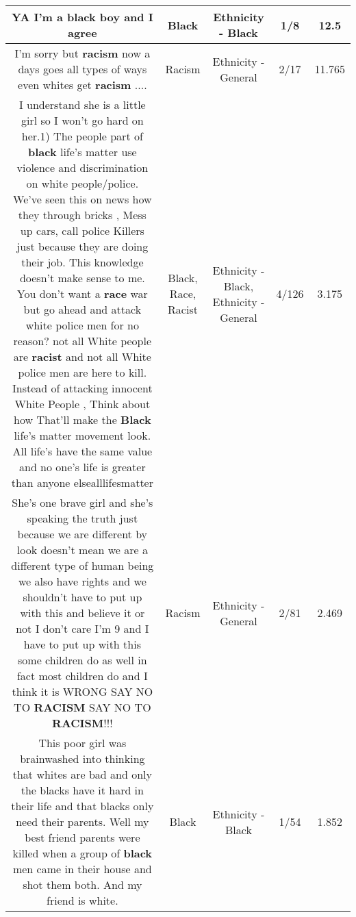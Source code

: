 \documentclass[11pt]{article}
\newlength\mylength
\begin{document}
\begin{center}
\begin{longtable}{|C{.65\mylength}|C{.30\mylength}|C{.12\mylength}|C{.12\mylength}|C{.12\mylength}|}
  \small YA I'm a \textbf{black} boy and I agree\normalsize   & Black & Ethnicity - Black & 1/8 & 12.5 \\  \hline
  \small I'm sorry but \textbf{racism} now a days goes all types of ways even whites get \textbf{racism} ....\normalsize   & Racism & Ethnicity - General & 2/17 & 11.765 \\  \hline
  \small I understand she is a little girl so I won't go hard on her.1) The people part of \textbf{black} life's matter use violence and discrimination on white people/police. We've seen this on news how they through bricks , Mess up cars, call police Killers just because they are doing their job. This knowledge doesn't make sense to me.  You don't want a \textbf{race} war but go ahead and attack white police men for no reason? not all White people are \textbf{racist} and not all White police men are here to kill. Instead of attacking innocent White People , Think about how That'll make the \textbf{Black} life's matter movement look. All life's have the same value and no one's life is greater than anyone elsealllifesmatter\normalsize   & Black, Race, Racist & Ethnicity - Black, Ethnicity - General & 4/126 & 3.175 \\  \hline
  \small She's one brave girl and she's speaking the truth just because we are different by look doesn't mean we are a different type of human being we also have rights and we shouldn't have to put up with this and  believe it or not I don't care I'm 9 and I have to put up with this some children do as well in fact most children do and I think it is WRONG SAY NO TO \textbf{RACISM} SAY NO TO \textbf{RACISM}!!!\normalsize   & Racism & Ethnicity - General & 2/81 & 2.469 \\  \hline
  \small This poor girl was brainwashed into thinking that whites are bad and only the blacks have it hard in their life and that blacks only need their parents. Well my best friend parents were killed when a group of \textbf{black} men came in their house and shot them both. And my friend is white.\normalsize   & Black & Ethnicity - Black & 1/54 & 1.852 \\  \hline

\end{longtable}
\end{center}
\end{document}
